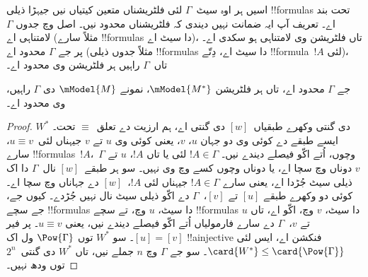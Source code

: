 \documentclass[../../../include/open-logic-section]{subfiles}
\begin{document}


اسیں ہر اوہ سیٹ~$\Gamma$ لئی فلٹریشناں متعین کیتیاں نیں جیہڑا ذیلی !!{formula}s تحت بند اے۔ تعریف آپ ایہ ضمانت نہیں دیندی کہ فلٹریشناں محدود نیں۔ اصل وچ جدوں $\Gamma$ لامتناہی اے (مثلاً سارے !!{formula}s دا سیٹ اے)، تاں فلٹریشن وی لامتناہی ہو سکدی اے۔ پر جے $\Gamma$ محدود اے (مثلاً جدوں ذیلی !!{formula}s دا سیٹ اے، دِتّے !!{formula}~$!A$ لئی)، تاں~$\Gamma$ راہیں ہر فلٹریشن وی محدود اے۔

\begin{prop}
  جے $\Gamma$ محدود اے، تاں ہر فلٹریشن $\mModel{M^*}$، نمونے
  $\mModel{M}$ دی $\Gamma$ راہیں، وی محدود اے۔
\end{prop}

\begin{proof}
  $W^*$ دی گنتی وکھرے طبقیاں~$[w]$ دی گنتی اے، ہم ارزیت دے تعلق~$\equiv$ تحت۔ ایسے طبقے دے کوئی وی دو جہان $u$، $v$، یعنی کوئی وی $u$ تے $v$ جیہناں لئی~$u \equiv v$، سارے !!{formula}s~$!A$،~$\Gamma$ وچوں، اُتے اکّو فیصلے دیندے نیں۔ $!A \in \Gamma$ لئی یا تاں $!A$،
  $u$ تے $v$ دوناں وچ سچا اے، یا دوناں وچوں کسے وچ وی نہیں۔ سو ہر طبقے~$[w]$ نال~$\Gamma$ دا اک ذیلی سیٹ جُڑدا اے، یعنی سارے $!A \in
  \Gamma$ جیہناں لئی $!A$،~$[w]$ دے جہاناں وچ سچا اے۔ کوئی دو وکھرے طبقے $[u]$ تے $[v]$،~$\Gamma$ دے اکّو ذیلی سیٹ نال نہیں جُڑدے۔ کیوں جے، جے سچے !!{formula}s دا سیٹ، $u$ وچ، تے سچے !!{formula}s دا سیٹ، $v$ وچ، اکّو اے، تاں
  $u$ تے $v$،~$\Gamma$ دے سارے فارمولیاں اُتے اکّو فیصلے دیندے نیں، یعنی $u \equiv v$۔ پر فیر $[u] = [v]$۔ سو
  $W^*$ توں $\Pow{\Gamma}$ ول اک !!a{injective} فنکشن اے، ایس لئی $\card{W^*} \le \card{\Pow{\Gamma}}$۔ سو جے $\Gamma$ وچ $n$ جملے نیں، تاں $W^*$ دی گنتی~$2^n$ توں ودھ نہیں۔
\end{proof}
\end{document}
